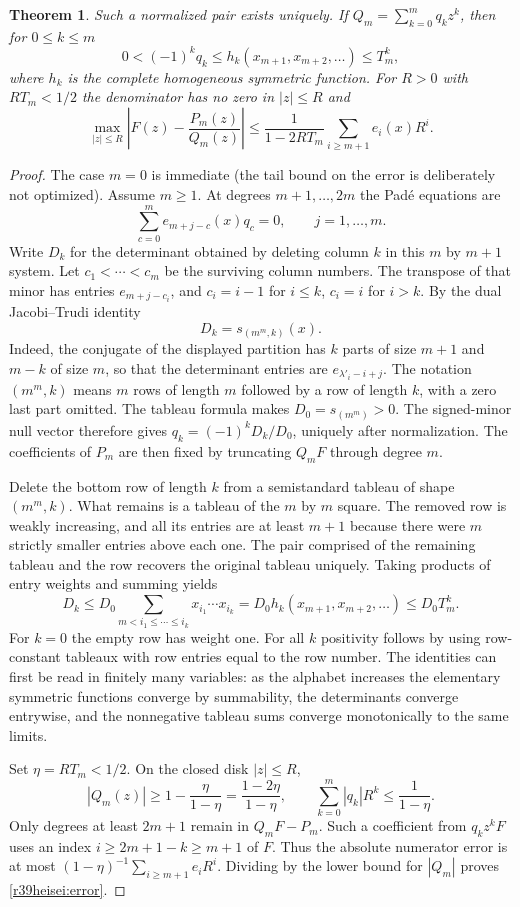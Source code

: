 \documentclass[11pt,a4paper]{article}
\numberwithin{equation}{section}
\newtheorem{theorem}{Theorem}[section]
\theoremstyle{definition}
\theoremstyle{remark}
\begin{document}
\begin{theorem}\label{r39heisei:tail}
Such a normalized pair exists uniquely. If $Q_m=\sum_{k=0}^m q_kz^k$, then for $0\le k\le m$
\[
 0<(-1)^kq_k\le h_k(x_{m+1},x_{m+2},\ldots)\le T_m^k ,
\]
where $h_k$ is the complete homogeneous symmetric function. For $R>0$ with $RT_m<1/2$ the denominator has no zero in $|z|\le R$ and
\begin{equation}
 \max_{|z|\le R}\left|F(z)-\frac{P_m(z)}{Q_m(z)}\right|
 \le\frac{1}{1-2RT_m}\sum_{i\ge m+1} e_i(x)R^i.
 \label{r39heisei:error}
\end{equation}
\end{theorem}
\begin{proof}
The case $m=0$ is immediate (the tail bound on the error is deliberately not optimized). Assume $m\ge1$. At degrees $m+1,\ldots,2m$ the Pad\'e equations are
\[
 \sum_{c=0}^m e_{m+j-c}(x)q_c=0,\qquad j=1,\ldots,m.
\]
Write $D_k$ for the determinant obtained by deleting column $k$ in this $m$ by $m+1$ system. Let $c_1<\cdots<c_m$ be the surviving column numbers. The transpose of that minor has entries $e_{m+j-c_i}$, and $c_i=i-1$ for $i\le k$, $c_i=i$ for $i>k$. By the dual Jacobi--Trudi identity
\[
 D_k=s_{(m^m,k)}(x).
\]
Indeed, the conjugate of the displayed partition has $k$ parts of size $m+1$ and $m-k$ of size $m$, so that the determinant entries are $e_{\lambda'_i-i+j}$. The notation $(m^m,k)$ means $m$ rows of length $m$ followed by a row of length $k$, with a zero last part omitted. The tableau formula makes $D_0=s_{(m^m)}>0$. The signed-minor null vector therefore gives $q_k=(-1)^kD_k/D_0$, uniquely after normalization. The coefficients of $P_m$ are then fixed by truncating $Q_mF$ through degree $m$.

Delete the bottom row of length $k$ from a semistandard tableau of shape $(m^m,k)$. What remains is a tableau of the $m$ by $m$ square. The removed row is weakly increasing, and all its entries are at least $m+1$ because there were $m$ strictly smaller entries above each one. The pair comprised of the remaining tableau and the row recovers the original tableau uniquely. Taking products of entry weights and summing yields
\[
 D_k\le D_0\sum_{m<i_1\le\cdots\le i_k}x_{i_1}\cdots x_{i_k}
 =D_0 h_k(x_{m+1},x_{m+2},\ldots)\le D_0T_m^k.
\]
For $k=0$ the empty row has weight one. For all $k$ positivity follows by using row-constant tableaux with row entries equal to the row number. The identities can first be read in finitely many variables: as the alphabet increases the elementary symmetric functions converge by summability, the determinants converge entrywise, and the nonnegative tableau sums converge monotonically to the same limits.

Set $\eta=RT_m<1/2$. On the closed disk $|z|\le R$,
\[
 |Q_m(z)|\ge1-\frac{\eta}{1-\eta}=\frac{1-2\eta}{1-\eta},
 \qquad \sum_{k=0}^m|q_k|R^k\le\frac1{1-\eta}.
\]
Only degrees at least $2m+1$ remain in $Q_mF-P_m$. Such a coefficient from $q_kz^kF$ uses an index $i\ge2m+1-k\ge m+1$ of $F$. Thus the absolute numerator error is at most $(1-\eta)^{-1}\sum_{i\ge m+1}e_iR^i$. Dividing by the lower bound for $|Q_m|$ proves \eqref{r39heisei:error}.
\end{proof}
\end{document}
